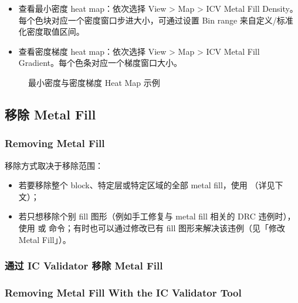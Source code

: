 \begin{itemize}
  \item 查看最小密度 heat map：依次选择 View > Map > ICV Metal Fill Density。每个色块对应一个密度窗口步进大小，可通过设置 Bin range 来自定义/标准化密度取值区间。
  \item 查看密度梯度 heat map：依次选择 View > Map > ICV Metal Fill Gradient。每个色条对应一个梯度窗口大小。
\end{itemize}

\begin{figure}[htbp]
\centering
{}
\caption{最小密度与密度梯度 Heat Map 示例}
\label{fig:density-heatmap}
\end{figure}

\subsection{移除 Metal Fill}
\subsubsection*{Removing Metal Fill}

移除方式取决于移除范围：
\begin{itemize}
  \item 若要移除整个 block、特定层或特定区域的全部 metal fill，使用 （详见下文）；
  \item 若只想移除个别 fill 图形（例如手工修复与 metal fill 相关的 DRC 违例时），使用  或  命令；有时也可以通过修改已有 fill 图形来解决该违例（见「修改 Metal Fill」）。
\end{itemize}

\subsubsection{通过 IC Validator 移除 Metal Fill}
\subsubsection*{Removing Metal Fill With the IC Validator Tool}

